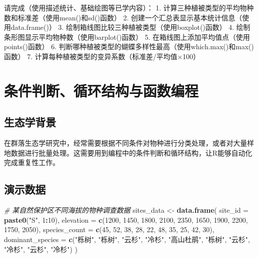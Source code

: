 \documentclass[
]{book}
\newenvironment{Shaded}{\begin{snugshade}}{\end{snugshade}}
\newcommand{\AttributeTok}[1]{\textcolor[rgb]{0.13,0.29,0.53}{#1}}
\newcommand{\CommentTok}[1]{\textcolor[rgb]{0.56,0.35,0.01}{\textit{#1}}}
\newcommand{\DecValTok}[1]{\textcolor[rgb]{0.00,0.00,0.81}{#1}}
\newcommand{\FunctionTok}[1]{\textcolor[rgb]{0.13,0.29,0.53}{\textbf{#1}}}
\newcommand{\NormalTok}[1]{#1}
\newcommand{\OtherTok}[1]{\textcolor[rgb]{0.56,0.35,0.01}{#1}}
\newcommand{\SpecialCharTok}[1]{\textcolor[rgb]{0.81,0.36,0.00}{\textbf{#1}}}
\newcommand{\StringTok}[1]{\textcolor[rgb]{0.31,0.60,0.02}{#1}}
\begin{document}
请完成（使用描述统计、基础绘图等已学内容）：
1. 计算三种植被类型的平均物种数和标准差（使用mean()和sd()函数）
2. 创建一个汇总表显示基本统计信息（使用data.frame()）
3. 绘制箱线图比较三种植被类型（使用boxplot()函数）
4. 绘制条形图显示平均物种数（使用barplot()函数）
5. 在箱线图上添加平均值点（使用points()函数）
6. 判断哪种植被类型的蝴蝶多样性最高（使用which.max()和max()函数）
7. 计算每种植被类型的变异系数（标准差/平均值×100）

\hypertarget{ux6761ux4ef6ux5224ux65adux5faaux73afux7ed3ux6784ux4e0eux51fdux6570ux7f16ux7a0b}{%
\section{条件判断、循环结构与函数编程}\label{ux6761ux4ef6ux5224ux65adux5faaux73afux7ed3ux6784ux4e0eux51fdux6570ux7f16ux7a0b}}

\hypertarget{ux751fux6001ux5b66ux80ccux666f-7}{%
\subsection{生态学背景}\label{ux751fux6001ux5b66ux80ccux666f-7}}

在群落生态学研究中，经常需要根据不同条件对物种进行分类处理，或者对大量样地数据进行批量处理。这需要用到编程中的条件判断和循环结构，让R能够自动化完成重复性工作。

\hypertarget{ux6f14ux793aux6570ux636e-6}{%
\subsection{演示数据}\label{ux6f14ux793aux6570ux636e-6}}

\begin{Shaded}
\begin{Highlighting}[]
\CommentTok{\# 某自然保护区不同海拔的物种调查数据}
\NormalTok{sites\_data }\OtherTok{\textless{}{-}} \FunctionTok{data.frame}\NormalTok{(}
  \AttributeTok{site\_id =} \FunctionTok{paste0}\NormalTok{(}\StringTok{"S"}\NormalTok{, }\DecValTok{1}\SpecialCharTok{:}\DecValTok{10}\NormalTok{),}
  \AttributeTok{elevation =} \FunctionTok{c}\NormalTok{(}\DecValTok{1200}\NormalTok{, }\DecValTok{1450}\NormalTok{, }\DecValTok{1800}\NormalTok{, }\DecValTok{2100}\NormalTok{, }\DecValTok{2350}\NormalTok{, }\DecValTok{1650}\NormalTok{, }\DecValTok{1900}\NormalTok{, }\DecValTok{2200}\NormalTok{, }\DecValTok{1750}\NormalTok{, }\DecValTok{2050}\NormalTok{),}
  \AttributeTok{species\_count =} \FunctionTok{c}\NormalTok{(}\DecValTok{45}\NormalTok{, }\DecValTok{52}\NormalTok{, }\DecValTok{38}\NormalTok{, }\DecValTok{28}\NormalTok{, }\DecValTok{22}\NormalTok{, }\DecValTok{48}\NormalTok{, }\DecValTok{35}\NormalTok{, }\DecValTok{25}\NormalTok{, }\DecValTok{42}\NormalTok{, }\DecValTok{30}\NormalTok{),}
  \AttributeTok{dominant\_species =} \FunctionTok{c}\NormalTok{(}\StringTok{"栎树"}\NormalTok{, }\StringTok{"栎树"}\NormalTok{, }\StringTok{"云杉"}\NormalTok{, }\StringTok{"冷杉"}\NormalTok{, }\StringTok{"高山杜鹃"}\NormalTok{, }\StringTok{"栎树"}\NormalTok{, }\StringTok{"云杉"}\NormalTok{, }\StringTok{"冷杉"}\NormalTok{, }\StringTok{"云杉"}\NormalTok{, }\StringTok{"冷杉"}\NormalTok{)}
\NormalTok{)}
\end{Highlighting}
\end{Shaded}
\end{document}
